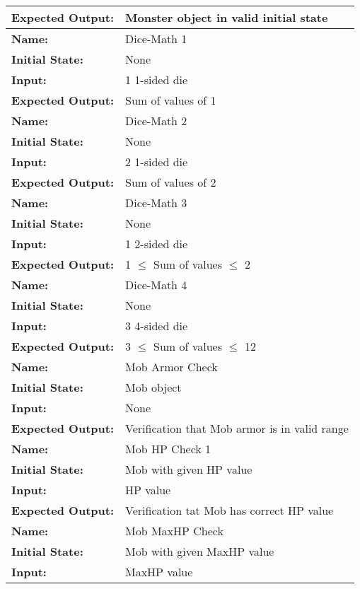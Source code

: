 \documentclass[12pt, titlepage]{article}
\begin{document}
\begin{center}
\begin{longtable}{ l | p{10cm} }
				\textbf{Expected Output:} & Monster object in valid initial state\\[0.6em]
				\hline
				\rule{0pt}{1.5em}\textbf{Name:} & Dice-Math 1\\
				\textbf{Initial State:} & None\\
				\textbf{Input:} & 1 1-sided die\\
				\textbf{Expected Output:} & Sum of values of 1\\[0.6em]
				\hline
				\rule{0pt}{1.5em}\textbf{Name:} & Dice-Math 2\\
				\textbf{Initial State:} & None\\
				\textbf{Input:} & 2 1-sided die\\
				\textbf{Expected Output:} & Sum of values of 2\\[0.6em]
				\hline
				\rule{0pt}{1.5em}\textbf{Name:} & Dice-Math 3\\
				\textbf{Initial State:} & None\\
				\textbf{Input:} & 1 2-sided die\\
				\textbf{Expected Output:} & 1 $\le$ Sum of values $\le$ 2\\[0.6em]
				\hline
				\rule{0pt}{1.5em}\textbf{Name:} & Dice-Math 4\\
				\textbf{Initial State:} & None\\
				\textbf{Input:} & 3 4-sided die\\
				\textbf{Expected Output:} & 3 $\le$ Sum of values $\le$ 12\\[0.6em]
				\hline
				\rule{0pt}{1.5em}\textbf{Name:} & Mob Armor Check\\
				\textbf{Initial State:} & Mob object\\
				\textbf{Input:} & None\\
				\textbf{Expected Output:} & Verification that Mob armor is in valid range\\[0.6em]
				\hline
				\rule{0pt}{1.5em}\textbf{Name:} & Mob HP Check 1\\
				\textbf{Initial State:} & Mob with given HP value\\
				\textbf{Input:} & HP value\\
				\textbf{Expected Output:} & Verification tat Mob has correct HP value\\[0.6em]
				\hline
				\rule{0pt}{1.5em}\textbf{Name:} & Mob MaxHP Check\\
				\textbf{Initial State:} & Mob with given MaxHP value\\
				\textbf{Input:} & MaxHP value\\

\end{longtable}
\end{center}
\end{document}

